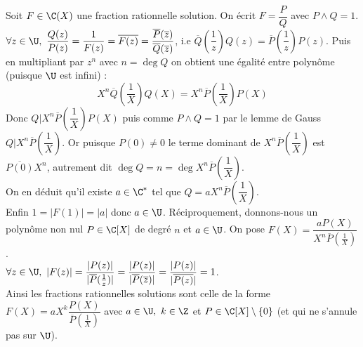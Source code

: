 \documentclass{book}
\begin{document}
\begin{enumerate}[leftmargin=*]
		Soit $F\in \C(X)$ une fraction rationnelle solution. On écrit $F=\dfrac{P}{Q}$ avec $P\wedge Q=1$.\\
		$\forall z\in \U,\ \dfrac{Q(z)}{P(z)}=\dfrac{1}{F(z)}=\overline{F(z)}=\dfrac{\overline P(\overline z)}{\overline Q(\overline z)}$, i.e $\overline Q\left(\dfrac{1}{z}\right)Q(z)=\overline P\left(\dfrac{1}{z}\right)P(z)$. Puis en multipliant par $z^n$ avec $n=\deg Q$ on obtient une égalité entre polynôme (puisque $\U$ est infini) :
		$$X^n\overline Q\left(\frac{1}{X}\right)Q(X)=X^n\overline P\left(\frac{1}{X}\right)P(X)$$
		Donc $Q|X^n\overline P\left(\dfrac{1}{X}\right)P(X)$ puis comme $P\wedge Q=1$ par le lemme de Gauss $Q|X^n\overline P\left(\dfrac{1}{X}\right)$. Or puisque $P(0)\ne 0$ le terme dominant de $X^n\overline P\left(\dfrac{1}{X}\right)$ est $\overline{P(0)}X^n$, autrement dit $\deg Q=n=\deg X^n\overline P\left(\dfrac{1}{X}\right)$.\\
		On en déduit qu'il existe $a\in \C^*$ tel que $Q=aX^n\overline P\left(\dfrac{1}{X}\right)$.\\
		Enfin $1=|F(1)|=|a|$ donc $a\in \U$.
		Réciproquement, donnons-nous un polynôme non nul $P\in \C[X]$ de degré $n$ et $a\in \U$. On pose $F(X)=\dfrac{aP(X)}{X^n\overline P(\frac{1}{X})}$.\\
		$\forall z\in \U,\ |F(z)|=\dfrac{|P(z)|}{|\overline P(\frac{1}{z})|}=\dfrac{|P(z)|}{|\overline P(\overline z)|}=\dfrac{|P(z)|}{|\overline{P(z)}|}=1$.\\
		Ainsi les fractions rationnelles solutions sont celle de la forme $F(X)=aX^k\dfrac{P(X)}{\overline P(\frac{1}{X})}$ avec $a\in \U,\ k\in \Z$ et $P\in \C[X]\setminus\{0\}$ (et qui ne s'annule pas sur $\U$).
	\end{enumerate}
	
\end{document}
